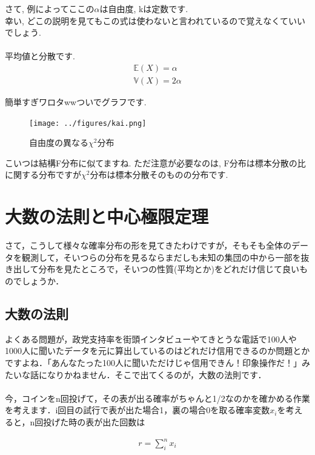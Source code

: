\documentclass[11pt,a4paper,uplatex]{ujreport} 	%
\begin{document}
さて, 例によってここの$\alpha$は自由度, kは定数です.\\

幸い, どこの説明を見てもこの式は使わないと言われているので覚えなくていいでしょう.\\
\\

平均値と分散です.
\begin{align}
\mathbb{E}(X) = \alpha \\
\mathbb{V}(X) = 2\alpha
\end{align}

簡単すぎワロタwwついでグラフです.


\begin{figure}[H]
\label{im:chi}
  \centering
  \texttt{[image: ../figures/kai.png]}
  \caption{自由度の異なる$\chi^2$分布}
\end{figure}
 
こいつは結構F分布に似てますね. ただ注意が必要なのは, F分布は標本分散の比に関する分布ですが$\chi^2$分布は標本分散そのものの分布です.


\chapter{大数の法則と中心極限定理}
さて，こうして様々な確率分布の形を見てきたわけですが，そもそも全体のデータを観測して，そいつらの分布を見るならまだしも未知の集団の中から一部を抜き出して分布を見たところで，そいつの性質(平均とか)をどれだけ信じて良いものでしょうか．\\


\section{大数の法則}

よくある問題が，政党支持率を街頭インタビューやてきとうな電話で100人や1000人に聞いたデータを元に算出しているのはどれだけ信用できるのか問題とかですよね．「あんなたった100人に聞いただけじゃ信用できん！印象操作だ！」みたいな話になりかねません．そこで出てくるのが，大数の法則です．\\
\\

今，コインをn回投げて，その表が出る確率がちゃんと1/2なのかを確かめる作業を考えます．i回目の試行で表が出た場合1，裏の場合0を取る確率変数$x_i$を考えると，n回投げた時の表が出た回数は

\begin{align}
  r = \sum_i^n x_i
\end{align}
\end{document}
